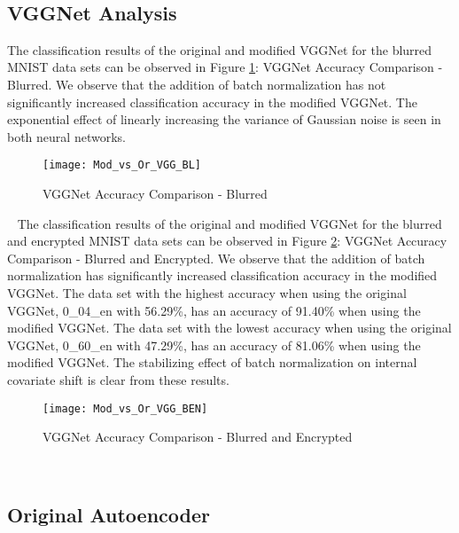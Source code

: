 \documentclass[12pt, titlepage]{article}
\begin{document}
~\newpage
\subsection{VGGNet Analysis}\label{VGGAnalysis}

The classification results of the original and modified VGGNet for the blurred MNIST data sets can be observed in Figure \ref{GRAPH_COMP_VGG_BL}: VGGNet Accuracy Comparison - Blurred. We observe that the addition of batch normalization has not significantly increased classification accuracy in the modified VGGNet. The exponential effect of linearly increasing the variance of Gaussian noise is seen in both neural networks.\\

\begin{figure}[h!]
	\begin{center}
		\texttt{[image: Mod\_vs\_Or\_VGG\_BL]}
		\caption{VGGNet Accuracy Comparison - Blurred}
		\label{GRAPH_COMP_VGG_BL}
	\end{center}
\end{figure}

~\newpage
\noindent The classification results of the original and modified VGGNet for the blurred and encrypted MNIST data sets can be observed in Figure \ref{GRAPH_COMP_VGG_BEN}: VGGNet Accuracy Comparison - Blurred and Encrypted. We observe that the addition of batch normalization has significantly increased classification accuracy in the modified VGGNet. The data set with the highest accuracy when using the original VGGNet, 0\_04\_en with 56.29\%, has an accuracy of 91.40\% when using the modified VGGNet. The data set with the lowest accuracy when using the original VGGNet, 0\_60\_en with 47.29\%, has an accuracy of 81.06\% when using the modified VGGNet. The stabilizing effect of batch normalization on internal covariate shift is clear from these results.\\

\begin{figure}[h!]
	\begin{center}
		\texttt{[image: Mod\_vs\_Or\_VGG\_BEN]}
		\caption{VGGNet Accuracy Comparison - Blurred and Encrypted}
		\label{GRAPH_COMP_VGG_BEN}
	\end{center}
\end{figure}

~\newpage
\subsection{Original Autoencoder}\label{EvalOrigAE} 
\end{document}
